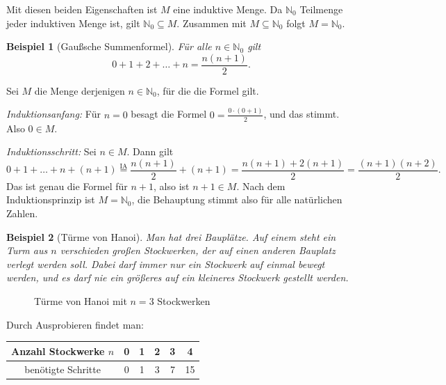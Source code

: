 \documentclass[a4paper]{article}
\makeatletter
\theoremstyle{kurzskript}
\newtheorem*{bsp}{Beispiel}
\renewenvironment{proof}[1][\proofname]{\par\pushQED{\qed}%
  \normalfont\topsep\medskipamount\relax
  \trivlist\item[\hskip\labelsep\bfseries #1\@addpunct{.}]\ignorespaces}%
  {\popQED\endtrivlist\@endpefalse}
\renewcommand{\proofname}{Beweis}
\newcommand{\N}{\mathbb{N}}
\makeatother
\begin{document}
\begin{proof}
Mit diesen beiden Eigenschaften ist $M$ eine induktive Menge. Da $\N_0$ Teilmenge jeder induktiven Menge ist, gilt $\N_0 \subseteq M$. Zusammen mit $M \subseteq \N_0$ folgt $M = \N_0$.
\end{proof}

\begin{bsp}[Gaußsche Summenformel]
Für alle $n \in \N_0$ gilt
\[
  0 + 1 + 2 + \dots + n = \frac{n(n+1)}{2}.
\]
\end{bsp}

\begin{proof}
Sei $M$ die Menge derjenigen $n \in \N_0$, für die die Formel gilt.

\emph{Induktionsanfang:} Für $n = 0$ besagt die Formel $0 = \frac{0 \cdot (0+1)}{2}$, und das stimmt. Also $0 \in M$.

\emph{Induktionsschritt:} Sei $n \in M$. Dann gilt
\[
  0 + 1 + \dots + n + (n+1) \overset{\text{IA}}{=} \frac{n(n+1)}{2} + (n + 1) = \frac{n(n+1) + 2(n+1)}{2} = \frac{(n+1)(n+2)}{2}.
\]
Das ist genau die Formel für $n + 1$, also ist $n + 1 \in M$. Nach dem Induktionsprinzip ist $M = \N_0$, die Behauptung stimmt also für alle natürlichen Zahlen.
\end{proof}

\begin{bsp}[Türme von Hanoi]
Man hat drei Bauplätze. Auf einem steht ein Turm aus $n$ verschieden großen Stockwerken, der auf einen anderen Bauplatz verlegt werden soll. Dabei darf immer nur ein Stockwerk auf einmal bewegt werden, und es darf nie ein größeres auf ein kleineres Stockwerk gestellt werden.
\end{bsp}

\begin{figure}[H]
\centering
{}
\caption{Türme von Hanoi mit $n = 3$ Stockwerken}
\end{figure}

Durch Ausprobieren findet man:
\begin{center}
\begin{tabular}{c|ccccc}
Anzahl Stockwerke $n$ & 0 & 1 & 2 & 3 & 4\\\hline
benötigte Schritte    & 0 & 1 & 3 & 7 & 15
\end{tabular}
\end{center}
\end{document}
